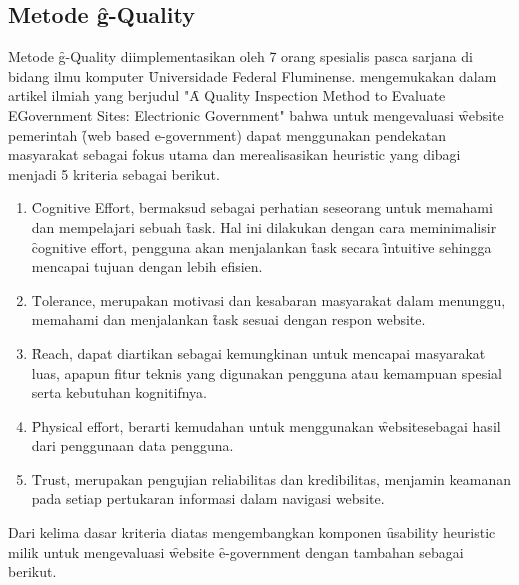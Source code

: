 \subsection{Metode \f{g-Quality}}\label{subsec:gquality}
Metode \f{g-Quality} diimplementasikan oleh 7 orang spesialis pasca sarjana di bidang ilmu komputer \f{Universidade Federal Fluminense}. \citet{paper.garcia} mengemukakan dalam artikel ilmiah yang berjudul "\f{A Quality Inspection Method to Evaluate EGovernment Sites: Electrionic Government}" bahwa untuk mengevaluasi \f{website} pemerintah \f{(web based e-government)} dapat menggunakan pendekatan masyarakat sebagai fokus utama dan merealisasikan heuristic yang dibagi menjadi 5 kriteria sebagai berikut.
\begin{enumerate}
	\item \f{Cognitive Effort}, bermaksud sebagai perhatian seseorang untuk memahami dan mempelajari sebuah \f{task}. Hal ini dilakukan dengan cara meminimalisir \f{cognitive effort}, pengguna akan menjalankan \f{task} secara \f{intuitive} sehingga mencapai tujuan dengan lebih efisien. 
	\item \f{Tolerance}, merupakan motivasi dan kesabaran masyarakat dalam menunggu, memahami dan menjalankan \f{task} sesuai dengan respon website.
	\item \f{Reach}, dapat diartikan sebagai kemungkinan untuk mencapai masyarakat luas, apapun fitur teknis yang digunakan pengguna atau kemampuan spesial serta kebutuhan kognitifnya. 
	\item \f{Physical effort}, berarti kemudahan untuk menggunakan \f{website}sebagai hasil dari penggunaan data pengguna.
	\item \f{Trust}, merupakan pengujian reliabilitas dan kredibilitas, menjamin keamanan pada setiap pertukaran informasi dalam navigasi website.
\end{enumerate}
Dari kelima dasar kriteria diatas \citeauthor{paper.garcia} mengembangkan komponen \f{usability heuristic} milik \citeauthor{article.nielsen} untuk mengevaluasi \f{website} \f{e-government} dengan tambahan sebagai berikut.
